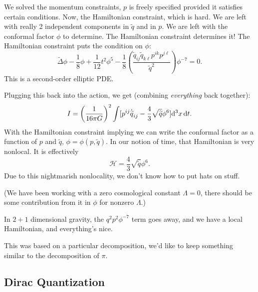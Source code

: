 We solved the momentum constraints, $p$ is freely specified provided it
satisfies certain conditions. Now, the Hamiltonian constraint, which is
hard. We are left with really 2 independent components in
$\widetilde{q}$ and in $p$. We are left with the conformal factor $\phi$
to determine. The Hamiltonian constraint determines it! The Hamiltonian
constraint puts the condition on $\phi$:
\begin{equation}
  \widetilde{\Delta}\phi - \frac{1}{8}\phi + \frac{1}{12}t^{2}\phi^{5}
  -\frac{1}{8}\left(\frac{\widetilde{q}_{ij}\widetilde{q}_{k\ell}p^{ik}p^{j\ell}}{\widetilde{q}^{2}}\right)\phi^{-7} = 0.
\end{equation}
This is a second-order elliptic PDE.

Plugging this back into the action, we get (combining \emph{everything}
back together):
\begin{equation}
I = \left(\frac{1}{16\pi G}\right)^{2}\int[p^{ij}\dot{\widetilde{q}}_{ij}-\frac{4}{3}\sqrt{\widetilde{q}}\phi^{6}]\mathrm{d}^{3}x\,\mathrm{d} t.
\end{equation}
With the Hamiltonian constraint implying we can write the conformal
factor as a function of $p$ and $\widetilde{q}$,
$\phi=\phi(p,\widetilde{q})$. In our notion of time, that Hamiltonian is
very nonlocal. It is effectively
\begin{equation}
\mathcal{H} = \frac{4}{3}\sqrt{\widetilde{q}}\phi^{6}.
\end{equation}
Due to this nightmarish nonlocality, we don't know how to put hats on stuff.

(We have been working with a zero cosmological constant $\Lambda=0$,
there should be some contribution from it in $\phi$ for nonzero
$\Lambda$.)

In $2+1$ dimensional gravity, the $q^{2}p^{2}\phi^{-7}$ term goes away,
and we have a local Hamiltonian, and everything's nice.

This was based on a particular decomposition, we'd like to keep
something similar to the decomposition of $\pi$.

\subsection{Dirac Quantization}

